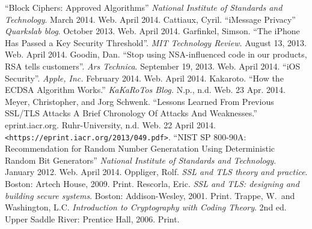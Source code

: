 \begin{thebibliography}{1}
 ``Block Ciphers: Approved Algorithms'' \textit{National Institute of Standards and Technology}. March 2014. Web. April 2014.
 Cattiaux, Cyril. ``iMessage Privacy'' \textit{Quarkslab blog}. October 2013. Web. April 2014.
 Garfinkel, Simson. ``The iPhone Has Passed a Key Security Threshold''. \textit{MIT Technology Review}. August 13, 2013. Web. April 2014.
 Goodin, Dan. ``Stop using NSA-influenced code in our products, RSA tells customers''. \textit{Ars Technica}. September 19, 2013. Web. April 2014.
 ``iOS Security''. \textit{Apple, Inc.} February 2014. Web. April 2014.
 Kakaroto. ``How the ECDSA Algorithm Works.'' \textit{KaKaRoTos Blog.} N.p., n.d. Web. 23 Apr. 2014.
 Meyer, Christopher, and Jorg Schwenk. ``Lessons Learned From Previous SSL/TLS Attacks A Brief Chronology Of Attacks And Weaknesses.'' eprint.iacr.org. Ruhr-University, n.d. Web. 22 April 2014. \verb#<https://eprint.iacr.org/2013/049.pdf>#.
 ``NIST SP 800-90A: Recommendation for Random Number Generatation Using Deterministic Random Bit Generators'' \textit{National Institute of Standards and Technology}. January 2012. Web. April 2014.
 Oppliger, Rolf. \textit{SSL and TLS theory and practice}. Boston: Artech House, 2009. Print.
 Rescorla, Eric. \textit{SSL and TLS: designing and building secure systems}. Boston: Addison-Wesley, 2001. Print.
 Trappe, W.\ and Washington, L.C. \textit{Introduction to Cryptography with Coding Theory}. 2nd ed. Upper Saddle River: Prentice Hall, 2006. Print.
\end{thebibliography}

